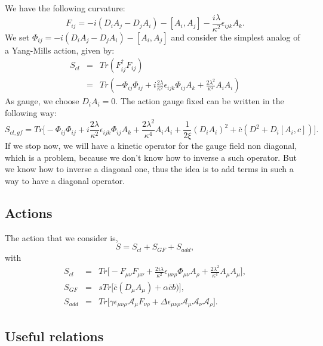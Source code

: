\documentclass[a4paper,11pt]{article} %
\numberwithin{equation}{section} %
\numberwithin{figure}{section} %
\theoremstyle{plain} %
\theoremstyle{definition} %
\theoremstyle{remark} %
\begin{document}
\noindent
We have the following curvature:
\begin{equation*}
 F_{ij} = - i ( D_{i} A_{j}  -  D_{j} A_{i} ) - [ A_{i} , A_{j} ] - \frac{i \lambda }{\kappa^{2}} \epsilon_{ijk} A_{k}. 
\end{equation*}
We set $ \Phi_{ij} = - i ( D_{i} A_{j}  -  D_{j} A_{i} ) - [ A_{i} , A_{j} ] $ and consider the simplest analog of a Yang-Mills action, given by:
\begin{eqnarray*}
 S_{cl} &=& Tr(F_{ij}^{\dagger} F_{ij}) \\
        &=& Tr(-\Phi_{ij}\Phi_{ij}+i\frac{2\lambda}{\kappa^2}\epsilon_{ijk}\Phi_{ij}A_{k}+\frac{2\lambda^2}{\kappa^4}A_iA_i)
\end{eqnarray*}
As gauge, we choose $D_{i} A_{i}=0$. The action gauge fixed can be written in the following way:
\begin{equation*}
 S_{cl,gf} = Tr \Bigg[ - \Phi_{ij}\Phi_{ij}+i\frac{2\lambda}{\kappa^2}\epsilon_{ijk}\Phi_{ij}A_{k}+\frac{2\lambda^2}{\kappa^4}A_iA_i + \frac{1}{2\xi}(D_iA_i)^2 + \bar{c} \left( D^2 +D_i [A_i , c] \right) \Bigg]. 
\end{equation*}
If we stop now, we will have a kinetic operator for the gauge field non diagonal, which is a problem, because we don't know how to inverse a such operator. But we know how to inverse a diagonal one, thus the idea is to add terms in such a way to have a diagonal operator.

\subsection*{Actions}

\noindent
The action that we consider is,
\begin{equation*}
 S = S_{cl} + S_{GF} + S_{add},
\end{equation*}
with
\begin{eqnarray*}
 S_{cl}    &=&   Tr \Bigg[-F_{\mu \nu} F_{\mu \nu}+\frac{2 i \lambda}{\kappa^2}\epsilon_{\mu \nu \rho}\Phi_{\mu \nu}A_{\rho}+\frac{2\lambda^2}{\kappa^4}A_\mu A_\mu \Bigg], \\
 S_{GF} &=&   s Tr \Bigg[ \bar{c} (D_\mu A_\mu) + \alpha \bar{c} b \big) \Bigg], \\
 S_{add}    &=&   Tr \Bigg[ \gamma \epsilon_{\mu \nu \rho} \mathcal{A}_\mu F_{\nu \rho} + \Delta \epsilon_{\mu \nu \rho} \mathcal{A}_{\mu} \mathcal{A}_{\nu} \mathcal{A}_{\rho} \Bigg].
\end{eqnarray*}

\subsection*{Useful relations}
\end{document}
